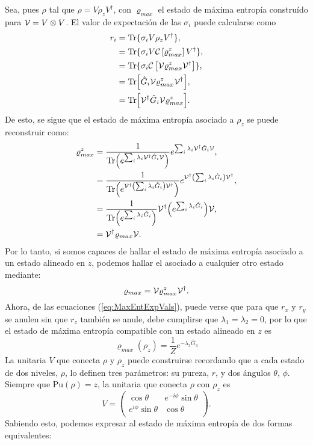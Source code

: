 Sea, pues $\rho$ tal que $\rho=V\rho_{z}V^{\dag}$, con $\varrho_{max}$ el estado de máxima entropía construído para  $\mathcal{V}=V\otimes V$. El valor de expectación de las $\sigma_{i}$ puede calcularse como
\begin{align*}
    r_{i}&=\Tr\{\sigma_{i}V\rho_{z}V^{\dag}\},\\
    &=\Tr\{\sigma_{i}V\mathcal{C}\left[\varrho_{max}^{z}\right]V^{\dag}\},\\
    &=\Tr\{\sigma_{i}\mathcal{C}\left[\mathcal{V}\varrho_{max}^{z}\mathcal{V}^{\dag}\right]\},\\
    &=\Tr[\hat{G}_{i}\mathcal{V}\varrho_{max}^{z}\mathcal{V}^{\dag}],\\
    &=\Tr[\mathcal{V}^{\dag}\hat{G}_{i}\mathcal{V}\varrho_{max}^{z}].\\
    \end{align*}
De esto, se sigue que el estado de máxima entropía asociado a $\rho_{z}$ se puede reconstruir como:
\begin{align*}
\varrho_{max}^{z}&=\frac{1}{\Tr(e^{\sum_{i}\lambda_{i}\mathcal{V}^{\dag}\hat{G}_{i}\mathcal{V}})}e^{\sum_{i}\lambda_{i}\mathcal{V}^{\dag}\hat{G}_{i}\mathcal{V}},\\
&=\frac{1}{\Tr(e^{\mathcal{V}^{\dag}\qty(\sum_{i}\lambda_{i}\hat{G}_{i})\mathcal{V}^{\dag}})}e^{\mathcal{V}^{\dag}\qty(\sum_{i}\lambda_{i}\hat{G}_{i})\mathcal{V}^{\dag}},\\
&=\frac{1}{\Tr(e^{\sum_{i}\lambda_{i}\hat{G}_{i}})}\mathcal{V}^{\dag}\qty(e^{\sum_{i}\lambda_{i}\hat{G}_{i}})\mathcal{V},\\
&=\mathcal{V}^{\dag}\varrho_{max}\mathcal{V}.
\end{align*}
Por lo tanto, si somos capaces de hallar el estado de máxima entropía asociado a un estado alineado en $z$, podemos hallar el asociado a cualquier otro estado mediante:
\begin{equation}
\varrho_{max}=\mathcal{V}\varrho_{max}^{z}\mathcal{V}^{\dag}.
\end{equation}
Ahora, de las ecuaciones (\ref{eq:MaxEntExpVals}), puede verse que para que $r_{x}$ y $r_{y}$ se anulen sin que $r_{z}$ también se anule, debe cumplirse que $\lambda_{1}=\lambda_{2}=0$, por lo que el estado de máxima entropía compatible con un estado alineado en $z$ es 
\begin{equation}
    \varrho_{max}(\rho_{z})=\frac{1}{Z}e^{-\lambda_{3}\hat{G}_{3}}
\end{equation}
La unitaria $V$ que conecta $\rho$ y $\rho_{z}$ puede construirse recordando que a cada estado de dos niveles, $\rho$, lo definen tres parámetros: su pureza, $r$, y dos ángulos $\theta$, $\phi$. Siempre que $\text{Pu}(\rho)=z$, la unitaria que conecta $\rho$ con $\rho_{z}$ es
\begin{equation}
  V=
  \begin{pmatrix}
      \cos{\theta} & e^{-i\phi}\sin{\theta}\\
      e^{i\phi}\sin{\theta}& \cos{\theta}\\
  \end{pmatrix}.
\end{equation}
Sabiendo esto, podemos expresar al estado de máxima entropía de dos formas equivalentes:

